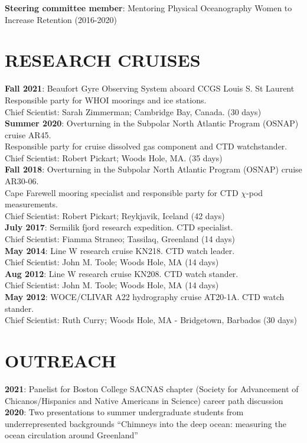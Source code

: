 \documentclass[paper=letter,fontsize=11pt]{scrartcl} %
\newcommand{\NewPart}[2]{\section*{\uppercase{#1} #2}}
\newcommand{\ShortEntry}[2]{\normalsize \noindent \textbf{#1}: #2 \\ }
\begin{document}
\ShortEntry{Steering committee member}{Mentoring Physical Oceanography Women to Increase Retention (2016-2020)}


\NewPart{Research Cruises}{}

\ShortEntry{Fall 2021}{Beaufort Gyre Observing System aboard CCGS Louis S. St Laurent\\ Responsible party for WHOI moorings and ice stations.\\ Chief Scientist: Sarah Zimmerman; Cambridge Bay, Canada. (30 days)}

\ShortEntry{Summer 2020}{Overturning in the Subpolar North Atlantic Program (OSNAP) cruise AR45.\\ Responsible party for cruise dissolved gas component and CTD watchstander.\\ Chief Scientist: Robert Pickart; Woods Hole, MA. (35 days)}

\ShortEntry{Fall 2018}{Overturning in the Subpolar North Atlantic Program (OSNAP) cruise AR30-06.\\ Cape Farewell mooring specialist and responsible party for CTD $\chi$-pod measurements.\\ Chief Scientist: Robert Pickart; Reykjavik, Iceland (42 days)}

\ShortEntry{July 2017}{Sermilik fjord research expedition. CTD specialist.\\ Chief Scientist: Fiamma Straneo; Tassilaq, Greenland (14 days)}

\ShortEntry{May 2014}{Line W research cruise KN218. CTD watch leader.\\ Chief Scientist: John M. Toole; Woods Hole, MA (14 days)}

\ShortEntry{Aug 2012}{Line W research cruise KN208. CTD watch stander.\\ Chief Scientist: John M. Toole; Woods Hole, MA (14 days)}

\ShortEntry{May 2012}{WOCE/CLIVAR A22 hydrography cruise AT20-1A. CTD watch stander.\\ Chief Scientist: Ruth Curry; Woods Hole, MA - Bridgetown, Barbados (30 days)}

\NewPart{Outreach}{}

\ShortEntry{2021}{Panelist for Boston College SACNAS chapter (Society for Advancement of Chicanos/Hispanics and Native Americans in Science) career path discussion}

\ShortEntry{2020}{Two presentations to summer undergraduate students from underrepresented backgrounds ``Chimneys into the deep ocean: measuring the ocean circulation around Greenland''}
\end{document}
